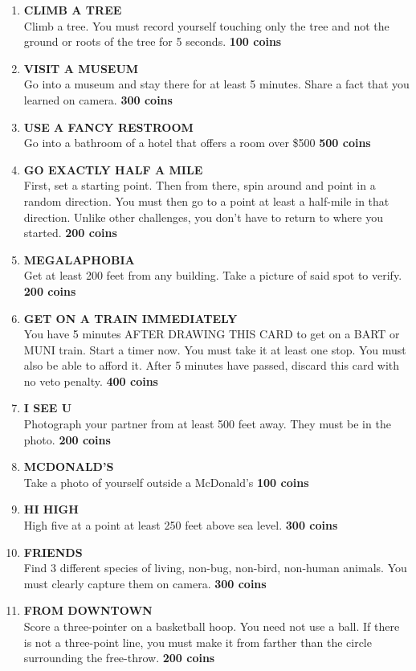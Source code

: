\documentclass{article}
\begin{document}
\begin{enumerate}
    \item \textbf{CLIMB A TREE} \\ Climb a tree. You must record yourself touching only the tree and not the ground or roots of the tree for 5 seconds. \textbf{100 coins}
    \item \textbf{VISIT A MUSEUM} \\ Go into a museum and stay there for at least 5 minutes. Share a fact that you learned on camera. \textbf{300 coins}
    \item \textbf{USE A FANCY RESTROOM} \\ Go into a bathroom of a hotel that offers a room over \$500 \textbf{500 coins}
    \item \textbf{GO EXACTLY HALF A MILE} \\ First, set a starting point. Then from there, spin around and point in a random direction. You must then go to a point at least a half-mile in that direction. Unlike other challenges, you don't have to return to where you started. \textbf{200 coins}
    \item \textbf{MEGALAPHOBIA} \\ Get at least 200 feet from any building. Take a picture of said spot to verify. \textbf{200 coins}
    \item \textbf{GET ON A TRAIN IMMEDIATELY} \\ You have 5 minutes AFTER DRAWING THIS CARD to get on a BART or MUNI train. Start a timer now. You must take it at least one stop. You must also be able to afford it. After 5 minutes have passed, discard this card with no veto penalty. \textbf{400 coins}
    \item \textbf{I SEE U}
    \\ Photograph your partner from at least 500 feet away. They must be in the photo. \textbf{200 coins}
    \item \textbf{MCDONALD'S}
    \\ Take a photo of yourself outside a McDonald's \textbf{100 coins}
    \item \textbf{HI HIGH}
    \\ High five at a point at least 250 feet above sea level. \textbf{300 coins}
    \item \textbf{FRIENDS}
    \\ Find 3 different species of living, non-bug, non-bird, non-human animals. You must clearly capture them on camera. \textbf{300 coins}
    \item \textbf{FROM DOWNTOWN} \\ Score a three-pointer on a basketball hoop. You need not use a ball. If there is not a three-point line, you must make it from farther than the circle surrounding the free-throw. \textbf{200 coins}

\end{enumerate}
\end{document}
